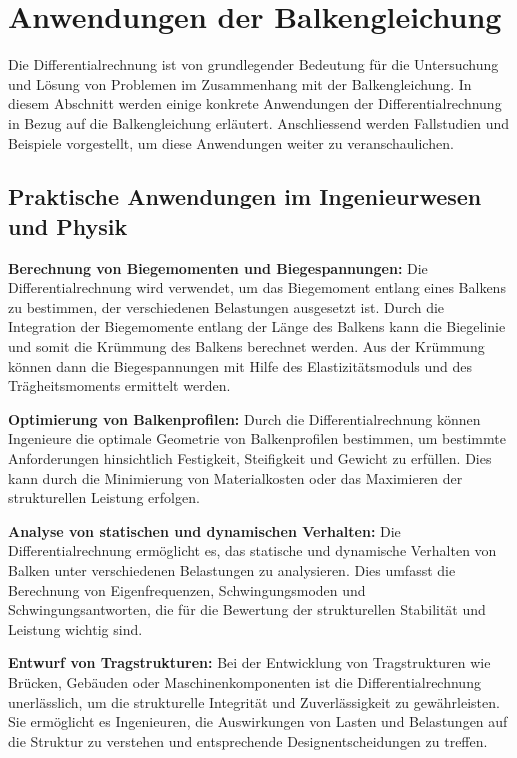 %
%
%
%
\section{Anwendungen der Balkengleichung
\label{balken:section:teil3}}

Die Differentialrechnung ist von grundlegender Bedeutung für die Untersuchung und Lösung von Problemen im Zusammenhang mit der Balkengleichung. 
In diesem Abschnitt werden einige konkrete Anwendungen der Differentialrechnung in Bezug auf die Balkengleichung erläutert. 
Anschliessend werden Fallstudien und Beispiele vorgestellt, um diese Anwendungen weiter zu veranschaulichen.

\subsection{Praktische Anwendungen im Ingenieurwesen und Physik
\label{Praktische Anwendungen im Ingenieurwissenschaften und Physik}}
\textbf{ Berechnung von Biegemomenten und Biegespannungen:}
Die Differentialrechnung wird verwendet, um das Biegemoment entlang eines Balkens zu bestimmen, der verschiedenen Belastungen ausgesetzt ist. 
Durch die Integration der Biegemomente entlang der Länge des Balkens kann die Biegelinie und somit die Krümmung des Balkens berechnet werden. 
Aus der Krümmung können dann die Biegespannungen mit Hilfe des Elastizitätsmoduls und des Trägheitsmoments ermittelt werden.

\textbf{ Optimierung von Balkenprofilen:}
Durch die Differentialrechnung können Ingenieure die optimale Geometrie von Balkenprofilen bestimmen, um bestimmte Anforderungen hinsichtlich Festigkeit, Steifigkeit und Gewicht zu erfüllen. 
Dies kann durch die Minimierung von Materialkosten oder das Maximieren der strukturellen Leistung erfolgen.

\textbf{ Analyse von statischen und dynamischen Verhalten:}
Die Differentialrechnung ermöglicht es, das statische und dynamische Verhalten von Balken unter verschiedenen Belastungen zu analysieren. 
Dies umfasst die Berechnung von Eigenfrequenzen, Schwingungsmoden und Schwingungsantworten, die für die Bewertung der strukturellen Stabilität und Leistung wichtig sind.

\textbf{ Entwurf von Tragstrukturen:}
Bei der Entwicklung von Tragstrukturen wie Brücken, Gebäuden oder Maschinenkomponenten ist die Differentialrechnung unerlässlich, um die strukturelle Integrität und Zuverlässigkeit zu gewährleisten. 
Sie ermöglicht es Ingenieuren, die Auswirkungen von Lasten und Belastungen auf die Struktur zu verstehen und entsprechende Designentscheidungen zu treffen.

